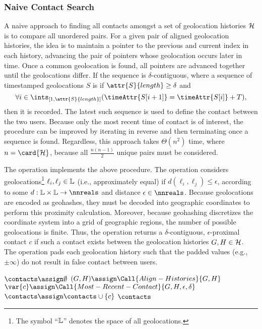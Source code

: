 \subsubsection{Naive Contact Search}\label{sec:naive-contact-search}
A naive approach to finding all contacts amongst a set of geolocation histories $\mathcal{H}$ is to compare all unordered pairs. For a given pair of aligned geolocation histories, the idea is to maintain a pointer to the previous and current index in each history, advancing the pair of pointers whose geolocation occurs later in time. Once a common geolocation is found, all pointers are advanced together until the geolocations differ. If the sequence is $\delta$-contiguous, where a sequence of timestamped geolocations $S$ is  if $\attr{S}{length} \geq \delta$ and
	\begin{equation*}
		\forall i \in \ints_{[1, \attr{S}{length}]}(\timeAttr{S[i + 1]} = \timeAttr{S[i]} + T),
	\end{equation*}
then it is recorded. The latest such sequence is used to define the contact between the two users. Because only the most recent time of contact is of interest, the procedure can be improved by iterating in reverse and then terminating once a sequence is found. Regardless, this approach takes $\Theta(n^2)$ time, where $n = \card{\histories}$, because all $\frac{n(n - 1)}{2}$ unique pairs must be considered.

The  operation implements the above procedure. The operation  considers geolocations\footnote{The symbol ``$\mathbb{L}$'' denotes the space of all geolocations.} $\ell_i, \ell_j \in \mathbb{L}$  (i.e., approximately equal) if $d(\ell_i, \ell_j) \leq \epsilon$, according to some  $d: \locations \times \locations \rightarrow \nnreals$ \cite[p. 118]{Kelley1975} and distance $\epsilon \in \nnreals$. Because geolocations are encoded as geohashes, they must be decoded into geographic coordinates to perform this proximity calculation. Moreover, because geohashing discretizes the coordinate system into a grid of geographic regions, the number of possible geolocations is finite. Thus, the operation returns a $\delta$-contiguous, $\epsilon$-proximal contact $c$ if such a contact exists between the geolocation histories $G, H \in \mathcal{H}$. The  operation pads each geolocation history such that the padded values (e.g., $\pm \infty$) do not result in false contact between users.
	\begin{algorithm}[ht!]
	\begin{algorithmic}[1]
		\State $\contacts \assign \emptyset$
			\State $(\hone, \htwo) \assign \Call{Align-Histories}{\hone, \htwo}$
			\State $\var{c} \assign \Call{Most-Recent-Contact}{\hone, \htwo, \epsilon, \delta}$
				\State $\contacts \assign \contacts \cup \{c\}$
			\EndIf
		\EndFor
		\State \Return $\contacts$
	\end{algorithmic}
	\end{algorithm}


